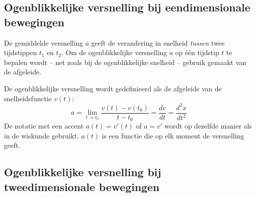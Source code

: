 \documentclass{ximera}
\begin{document}
\subsection*{Ogenblikkelijke versnelling bij eendimensionale bewegingen}

De gemiddelde versnelling \(\overline{a}\) geeft de verandering in snelheid \textit{tussen} twee tijdstippen \(t_1\) en \(t_2\).  Om de ogenblikkelijke versnelling \(a\) op één tijdstip \(t\) te bepalen wordt -- net zoals bij de ogenblikkelijke snelheid -- gebruik gemaakt van de afgeleide.

\begin{definition}
	De ogenblikkelijke versnelling wordt gedefinieerd als de afgeleide van de snelheidsfunctie \(v(t)\):
	\[
		a=\lim_{t\to t_0}\frac{v(t)-v(t_0)}{t-t_0} = \frac{dv}{dt}=\frac{d^2x}{dt^2}
		\]
		De notatie met een accent $a(t)=v'(t)$ of $a=v'$ wordt op dezelfde manier als in de wiskunde gebruikt. $a(t)$ is een functie die op elk moment de versnelling geeft. 
	\end{definition}
	
	

\subsection*{Ogenblikkelijke versnelling bij tweedimensionale bewegingen}
	
	


\end{document}
